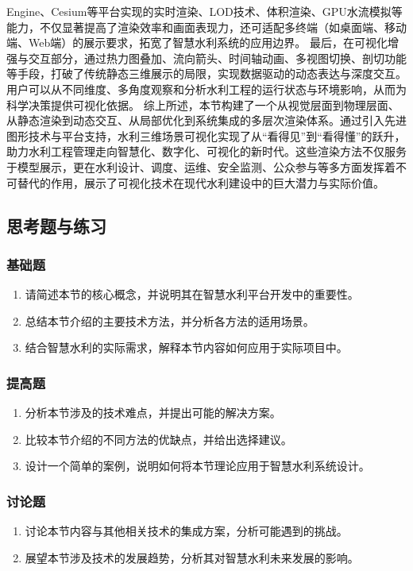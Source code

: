 Engine、Cesium等平台实现的实时渲染、LOD技术、体积渲染、GPU水流模拟等能力，不仅显著提高了渲染效率和画面表现力，还可适配多终端（如桌面端、移动端、Web端）的展示要求，拓宽了智慧水利系统的应用边界。 最后，在可视化增强与交互部分，通过热力图叠加、流向箭头、时间轴动画、多视图切换、剖切功能等手段，打破了传统静态三维展示的局限，实现数据驱动的动态表达与深度交互。用户可以从不同维度、多角度观察和分析水利工程的运行状态与环境影响，从而为科学决策提供可视化依据。 综上所述，本节构建了一个从视觉层面到物理层面、从静态渲染到动态交互、从局部优化到系统集成的多层次渲染体系。通过引入先进图形技术与平台支持，水利三维场景可视化实现了从``看得见''到``看得懂''的跃升，助力水利工程管理走向智慧化、数字化、可视化的新时代。这些渲染方法不仅服务于模型展示，更在水利设计、调度、运维、安全监测、公众参与等多方面发挥着不可替代的作用，展示了可视化技术在现代水利建设中的巨大潜力与实际价值。 \subsection{思考题与练习}\label{ux601dux8003ux9898ux4e0eux7ec3ux4e60} \subsubsection{基础题}\label{ux57faux7840ux9898} \begin{enumerate} \def\labelenumi{\arabic{enumi}.} \item 请简述本节的核心概念，并说明其在智慧水利平台开发中的重要性。 \item 总结本节介绍的主要技术方法，并分析各方法的适用场景。 \item 结合智慧水利的实际需求，解释本节内容如何应用于实际项目中。 \end{enumerate} \subsubsection{提高题}\label{ux63d0ux9ad8ux9898} \begin{enumerate} \def\labelenumi{\arabic{enumi}.} \setcounter{enumi}{3} \item 分析本节涉及的技术难点，并提出可能的解决方案。 \item 比较本节介绍的不同方法的优缺点，并给出选择建议。 \item 设计一个简单的案例，说明如何将本节理论应用于智慧水利系统设计。 \end{enumerate} \subsubsection{讨论题}\label{ux8ba8ux8bbaux9898} \begin{enumerate} \def\labelenumi{\arabic{enumi}.} \setcounter{enumi}{6} \item 讨论本节内容与其他相关技术的集成方案，分析可能遇到的挑战。 \item 展望本节涉及技术的发展趋势，分析其对智慧水利未来发展的影响。 \end{enumerate} 